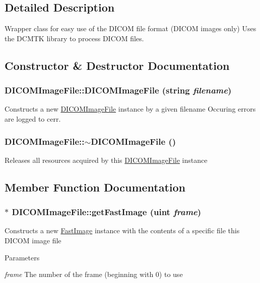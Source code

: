 \subsection{Detailed Description}
Wrapper class for easy use of the DICOM file format (DICOM images only) Uses the DCMTK library to process DICOM files. 

\subsection{Constructor \& Destructor Documentation}
\hypertarget{class_d_i_c_o_m_image_file_ae4778b6e6ed2c36f47fe3e785b55bb2e}{
\subsubsection[{DICOMImageFile}]{\setlength{\rightskip}{0pt plus 5cm}DICOMImageFile::DICOMImageFile (string {\em filename})}}
\label{class_d_i_c_o_m_image_file_ae4778b6e6ed2c36f47fe3e785b55bb2e}
Constructs a new \hyperlink{class_d_i_c_o_m_image_file}{DICOMImageFile} instance by a given filename Occuring errors are logged to cerr. \hypertarget{class_d_i_c_o_m_image_file_af210a193559ee3287aa1f9c4bf13d3ab}{
\subsubsection[{$\sim$DICOMImageFile}]{\setlength{\rightskip}{0pt plus 5cm}DICOMImageFile::$\sim$DICOMImageFile ()}}
\label{class_d_i_c_o_m_image_file_af210a193559ee3287aa1f9c4bf13d3ab}
Releases all resources acquired by this \hyperlink{class_d_i_c_o_m_image_file}{DICOMImageFile} instance 

\subsection{Member Function Documentation}
\hypertarget{class_d_i_c_o_m_image_file_a05f3f6fc5046ade1848a4d3c6561f6ad}{
\subsubsection[{getFastImage}]{ $\ast$ DICOMImageFile::getFastImage (uint {\em frame})}}
\label{class_d_i_c_o_m_image_file_a05f3f6fc5046ade1848a4d3c6561f6ad}
Constructs a new \hyperlink{class_fast_image}{FastImage} instance with the contents of a specific file this DICOM image file 
\begin{DoxyParams}{Parameters}
\item[{\em frame}]The number of the frame (beginning with 0) to use \end{DoxyParams}


